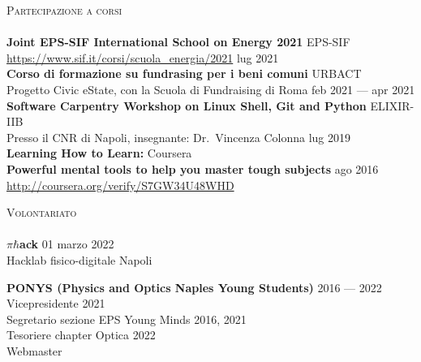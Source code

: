 \documentclass[a4paper]{article}
\newcommand{\lineunder} {
  \vspace*{-8pt} \\
  \hspace*{-18pt} \hrulefill \\
}
\newcommand{\header} [1] {
  {\hspace*{-18pt}\vspace*{6pt} \textsc{#1}}
  \vspace*{-6pt} \lineunder
}
\begin{document}
\header{Partecipazione a corsi}
\textbf{Joint EPS-SIF International School on Energy 2021} \hfill EPS-SIF \\
\url{https://www.sif.it/corsi/scuola_energia/2021} \hfill lug 2021 \\
\vspace*{2mm}
\textbf{Corso di formazione su fundrasing per i beni comuni} \hfill URBACT \\
Progetto Civic eState, con la Scuola di Fundraising di Roma \hfill feb 2021 --- apr 2021\\
\vspace*{2mm}
\textbf{Software Carpentry Workshop on Linux Shell, Git and Python} \hfill ELIXIR-IIB\\
Presso il CNR di Napoli, insegnante: Dr.\ Vincenza Colonna \hfill lug 2019\\
\vspace*{2mm}
\textbf{Learning How to Learn:} \hfill Coursera\\
\textbf{Powerful mental tools to help you master tough subjects} \hfill ago 2016\\
\url{http://coursera.org/verify/S7GW34U48WHD}\\
\vspace*{2mm}

\header{Volontariato}

\(\pi\hbar\)\textbf{ack} \hfill 01 marzo 2022 \\
Hacklab fisico-digitale \hfill Napoli \\
\vspace{2mm}

\textbf{PONYS (Physics and Optics Naples Young Students)} \hfill 2016 --- 2022\\
Vicepresidente \hfill 2021\\
Segretario sezione EPS Young Minds \hfill 2016, 2021\\
Tesoriere chapter Optica \hfill 2022\\
Webmaster\\
\vspace{2mm}
\end{document}

